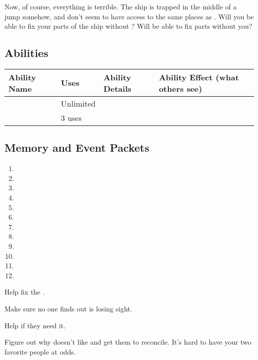 \documentclass[char]{TMFHope}
\begin{document}
Now, of course, everything is terrible. The ship is trapped in the middle of a jump somehow, and don't seem to have access to the same places as \cEng{}. Will you be able to fix your parts of the ship without \cEng{\them}? Will \cEng{\they} be able to fix \cEng{\their} parts without you?


\subsection*{Abilities}
\begin{tabular}{|p{2cm}|p{1.5cm}|p{9cm}|p{3.5cm}|} 
 \hline
 \textbf{Ability Name} & \textbf{Uses} & \textbf{Ability Details} & \textbf{Ability Effect (what others see)} \\ 
\hline 
 \aEngineering{\MYname} & Unlimited & \aEngineering{\MYtext} & \aEngineering{\MYeffect} \\ 
\hline
 \aNegotiation{\MYname} & 3 uses & \aNegotiation{\MYtext} & \aNegotiation{\MYeffect}\\ 
 \hline
\end{tabular}

\subsection*{Memory and Event Packets}
\begin{enumerate}
	\item \mPractice{\MYname}
	\item \mAlpha{\MYname}
	\item \mDeckHandOne{\MYname}
	\item \mRepairsTwo{\MYname}
	\item \mRepairsFour{\MYname}
	\item \mBroom{\MYname}
	\item \mLab{\MYname}
	\item \mPatient{\MYname}
	\item \mKitchen{\MYname}
	\item \mWeight{\MYname}
	\item \mTheater{\MYname}
	\item \mCrates{\MYname}
\end{enumerate}

\begin{itemz}[Goals]
	\item Help \cEng{} fix the \pNew{}.
	\item Make sure no one finds out \cEng{} is losing \cEng{\their} sight.
	\item Help \cNav{} if they need it.
	\item Figure out why \cEng{} doesn't like \cNav{} and get them to reconcile. It's hard to have your two favorite people at odds.
\end{itemz}
\end{document}
